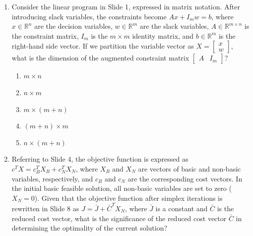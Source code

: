 \documentclass{article}%
\begin{document}
\begin{enumerate}
\begin{enumerate}
\begin{enumerate}
\item One table represents the primal simplex method, and the other represents the dual simplex method. The optimal objective function values are equal, and complementary slackness is reflected in the relationship between basic and non-basic variables in both tables.%
\item The tables are identical, except for a change of sign in the basic variable values.%
\end{enumerate}%
\vspace{0.5em}%
\end{enumerate}%
\item Consider the linear program in Slide 1, expressed in matrix notation. After introducing slack variables, the constraints become $Ax + I_m w = b$, where $x \in \mathbb{R}^n$ are the decision variables, $w \in \mathbb{R}^m$ are the slack variables, $A \in \mathbb{R}^{m \times n}$ is the constraint matrix, $I_m$ is the $m \times m$ identity matrix, and $b \in \mathbb{R}^m$ is the right-hand side vector.  If we partition the variable vector as $X = \begin{bmatrix} x \\ w \end{bmatrix}$, what is the dimension of the augmented constraint matrix $\begin{bmatrix} A & I_m \end{bmatrix}$?%
\begin{enumerate}%
\item $m \times n$%
\item $n \times m$%
\item $m \times (m+n)$%
\item $(m+n) \times m$%
\item $n \times (m+n)$%
\end{enumerate}%
\vspace{1em}%
\item Referring to Slide 4, the objective function is expressed as $c^T X = c_B^T X_B + c_N^T X_N$, where $X_B$ and $X_N$ are vectors of basic and non-basic variables, respectively, and $c_B$ and $c_N$ are the corresponding cost vectors.  In the initial basic feasible solution, all non-basic variables are set to zero ($X_N = 0$).  Given that the objective function after simplex iterations is rewritten in Slide 8 as $J = \bar{J} + \bar{C}^T X_N$, where $\bar{J}$ is a constant and $\bar{C}$ is the reduced cost vector, what is the significance of the reduced cost vector $\bar{C}$ in determining the optimality of the current solution?%

\end{enumerate}
\end{document}
